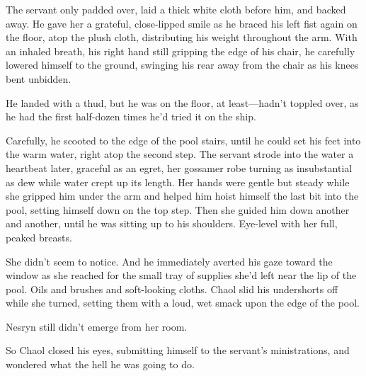 The servant only padded over, laid a thick white cloth before him, and backed away.
He gave her a grateful, close-lipped smile as he braced his left fist again on the floor, atop the plush cloth, distributing his weight throughout the arm.
With an inhaled breath, his right hand still gripping the edge of his chair, he carefully lowered himself to the ground, swinging his rear away from the chair as his knees bent unbidden.

He landed with a thud, but he was on the floor, at least---hadn't toppled over, as he had the first half-dozen times he'd tried it on the ship.

Carefully, he scooted to the edge of the pool stairs, until he could set his feet into the warm water, right atop the second step.
The servant strode into the water a heartbeat later, graceful as an egret, her gossamer robe turning as insubstantial as dew while water crept up its length.
Her hands were gentle but steady while she gripped him under the arm and helped him hoist himself the last bit into the pool, setting himself down on the top step.
Then she guided him down another and another, until he was sitting up to his shoulders.
Eye-level with her full, peaked breasts.

She didn't seem to notice.
And he immediately averted his gaze toward the window as she reached for the small tray of supplies she'd left near the lip of the pool.
Oils and brushes and soft-looking cloths.
Chaol slid his undershorts off while she turned, setting them with a loud, wet smack upon the edge of the pool.

Nesryn still didn't emerge from her room.

So Chaol closed his eyes, submitting himself to the servant's ministrations, and wondered what the hell he was going to do.

